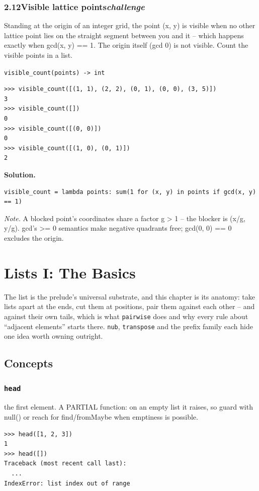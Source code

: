 \documentclass[10pt,letterpaper]{book}
\begin{document}
\subsection*{2.12\quad Visible lattice points\hfill\textnormal{\textit{challenge}}}
Standing at the origin of an integer grid, the point (x, y) is visible when no other lattice point lies on the straight segment between you and it -- which happens exactly when gcd(x, y) == 1. The origin itself (gcd 0) is not visible. Count the visible points in a list.

\noindent\texttt{visible\_count(points) -> int}
\begin{lstlisting}[style=ex]
>>> visible_count([(1, 1), (2, 2), (0, 1), (0, 0), (3, 5)])
3
>>> visible_count([])
0
>>> visible_count([(0, 0)])
0
>>> visible_count([(1, 0), (0, 1)])
2
\end{lstlisting}
\noindent\textbf{Solution.}
\begin{lstlisting}[style=code]
visible_count = lambda points: sum(1 for (x, y) in points if gcd(x, y) == 1)
\end{lstlisting}
\noindent\textit{Note.} A blocked point's coordinates share a factor g > 1 -- the blocker is (x/g, y/g). gcd's >= 0 semantics make negative quadrants free; gcd(0, 0) == 0 excludes the origin.

\clearpage
\chapter{Lists I: The Basics}

The list is the prelude's universal substrate, and this chapter is its
anatomy: take lists apart at the ends, cut them at positions, pair them
against each other -- and against their own tails, which is what
\texttt{pairwise} does and why every rule about ``adjacent elements'' starts
there. \texttt{nub}, \texttt{transpose} and the prefix family each hide one
idea worth owning outright.
\section{Concepts}
\subsection{\texttt{head}}\label{def:head}
the first element. A PARTIAL function: on an empty list it raises, so guard with null() or reach for find/fromMaybe when emptiness is possible.
\begin{lstlisting}[style=ex]
>>> head([1, 2, 3])
1
>>> head([])
Traceback (most recent call last):
  ...
IndexError: list index out of range
\end{lstlisting}
\end{document}
